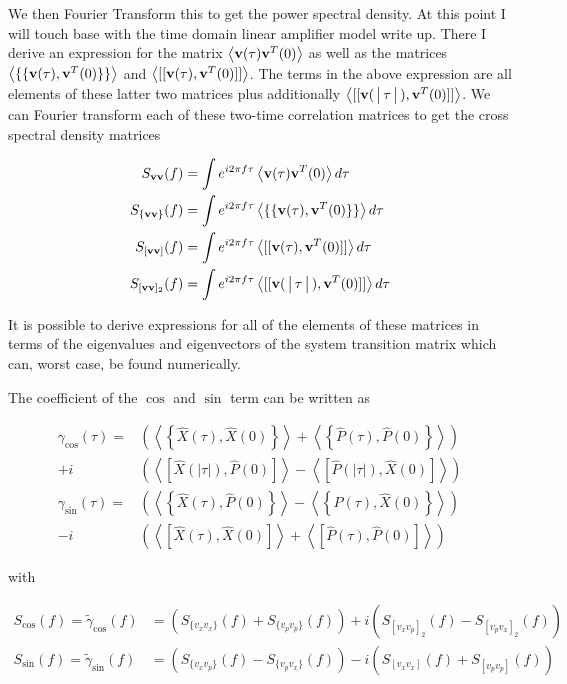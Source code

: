 \documentclass[12pt]{article}
\newcommand{\bv}[1]{\textbf{#1}}
\newcommand{\braketacomm}[1]{\left\langle\left\{#1\right\} \right\rangle}
\newcommand{\braketcomm}[1]{\left\langle\left[#1\right] \right\rangle}
\begin{document}
We then Fourier Transform this to get the power spectral density. At this point I will touch base with the time domain linear amplifier model write up. There I derive an expression for the matrix $\Braket{\bv{v}(\tau)\bv{v}^T(0)}$ as well as the matrices $\Braket{\{\{\bv{v}(\tau),\bv{v}^T(0)\}\}}$ and $\Braket{[[\bv{v}(\tau),\bv{v}^T(0)]]}$. The terms in the above expression are all elements of these latter two matrices plus additionally $\Braket{[[\bv{v}(|\tau|),\bv{v}^T(0)]]}$. We can Fourier transform each of these two-time correlation matrices to get the cross spectral density matrices

\begin{align}
S_{\bv{v}\bv{v}}(f) &= \int e^{i 2\pi f \tau} \Braket{\bv{v}(\tau)\bv{v}^T(0)} d\tau\\
S_{\{\bv{v}\bv{v}\}}(f) &= \int e^{i 2\pi f \tau} \Braket{\{\{\bv{v}(\tau),\bv{v}^T(0)\}\}} d\tau\\
S_{[\bv{v}\bv{v}]}(f) &= \int e^{i 2\pi f \tau} \Braket{[[\bv{v}(\tau),\bv{v}^T(0)]]} d\tau\\
S_{[\bv{v}\bv{v}]_2}(f) &= \int e^{i 2\pi f \tau} \Braket{[[\bv{v}(|\tau|),\bv{v}^T(0)]]} d\tau\\
\end{align}

It is possible to derive expressions for all of the elements of these matrices in terms of the eigenvalues and eigenvectors of the system transition matrix which can, worst case, be found numerically.

The coefficient of the $\cos$ and $\sin$ term can be written as

\begin{align}
\gamma_{\cos}(\tau) = &\left(\braketacomm{\hat{X}(\tau),\hat{X}(0)} + \braketacomm{\hat{P}(\tau),\hat{P}(0)}\right) \\
+i&\left(\braketcomm{\hat{X}(|\tau|),\hat{P}(0)} - \braketcomm{\hat{P}(|\tau|),\hat{X}(0)}  \right)\\
\gamma_{\sin}(\tau) = 
&\left(\braketacomm{\hat{X}(\tau),\hat{P}(0)} - \braketacomm{\hat{P}(\tau),\hat{X}(0)}\right) \\
-i&\left(\braketcomm{\hat{X}(\tau),\hat{X}(0)} + \braketcomm{\hat{P}(\tau),\hat{P}(0)}  \right)
\end{align}

with

\begin{align}
S_{\text{cos}}(f) = \tilde{\gamma}_{\cos}(f)&= (S_{\{v_x v_x\}}(f) + S_{\{v_p v_p\}}(f)) +i(S_{[v_x v_p]_2}(f) - S_{[v_p v_x]_2}(f))\\
S_{\text{sin}}(f) = \tilde{\gamma}_{\sin}(f) &= (S_{\{v_x v_p\}}(f) - S_{\{v_p v_x\}}(f)) -i(S_{[v_x v_x]}(f) + S_{[v_p v_p]}(f))
\end{align}
\end{document}

